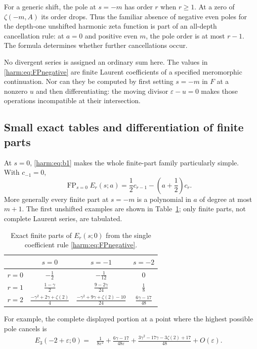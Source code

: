 For a generic shift, the pole at $s=-m$ has order $r$ when $r\geq1$.
At a zero of $\zeta(-m,A)$ its order drops.  Thus the familiar
absence of negative even poles for the depth-one unshifted harmonic
zeta function is part of an all-depth cancellation rule: at $a=0$
and positive even $m$, the pole order is at most $r-1$.  The formula
determines whether further cancellations occur.

No divergent series is assigned an ordinary sum here.  The values in
\eqref{harm:eq:FPnegative} are finite Laurent coefficients of a
specified meromorphic continuation.  Nor can they be computed by
first setting $s=-m$ in $F$ at a nonzero $u$ and then differentiating:
the moving divisor $\varepsilon-u=0$ makes those operations
incompatible at their intersection.

\subsection{Small exact tables and differentiation of finite parts}

At $s=0$, \eqref{harm:eq:b1} makes the whole finite-part family
particularly simple.  With $c_{-1}=0$,
\begin{equation}\label{harm:eq:zeroall}
 \operatorname{FP}_{s=0}E_r(s;a)
       =\frac12c_{r-1}-\left(a+\frac12\right)c_r.
\end{equation}
More generally every finite part at $s=-m$ is a polynomial in $a$
of degree at most $m+1$.  The first unshifted examples are shown in
Table~\ref{harm:tab:FP}; only finite parts, not complete Laurent
series, are tabulated.

\begin{table}[htbp]
\centering
\small
\renewcommand{\arraystretch}{1.6}
\begin{tabular}{c|ccc}
 & $s=0$ & $s=-1$ & $s=-2$\\\hline
 $r=0$ & $-\tfrac12$ & $-\tfrac1{12}$ & $0$\\
 $r=1$ & $\tfrac{1-\gamma}{2}$ & $\tfrac{9-2\gamma}{24}$ & $\tfrac18$\\
 $r=2$ & $\tfrac{-\gamma^2+2\gamma+\zeta(2)}4$
       & $\tfrac{-\gamma^2+9\gamma+\zeta(2)-10}{24}$
       & $\tfrac{6\gamma-17}{48}$
\end{tabular}
\caption{Exact finite parts of $E_r(s;0)$ from the single
coefficient rule \eqref{harm:eq:FPnegative}.}
\label{harm:tab:FP}
\end{table}

For example, the complete displayed portion at a point where the
highest possible pole cancels is
\begin{align}
 E_3(-2+\varepsilon;0)
  ={}&\frac1{8\varepsilon^2}
       +\frac{6\gamma-17}{48\varepsilon}
       +\frac{3\gamma^2-17\gamma-3\zeta(2)+17}{48}
       +O(\varepsilon).\label{harm:eq:cancelledexample}
\end{align}


